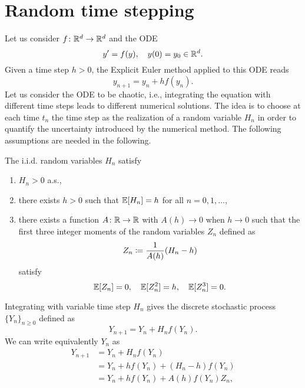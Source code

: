 \documentclass{scrartcl}
\begin{document}
	
\section{Random time stepping}

Let us consider $f\colon\mathbb{R}^d\to\mathbb{R}^d$ and the ODE 
\begin{equation}
	y' = f(y), \quad y(0) = y_0 \in \mathbb{R}^d.
\end{equation}
Given a time step $h > 0$, the Explicit Euler method applied to this ODE reads
\begin{equation}
	y_{n+1} = y_n + h f(y_n).
\end{equation}
Let us consider the ODE to be chaotic, i.e., integrating the equation with different time steps leads to different numerical solutions. The idea is to choose at each time $t_n$ the time step as the realization of a random variable $H_n$ in order to quantify the uncertainty introduced by the numerical method. The following assumptions are needed in the following.
\begin{assumption}\label{as:assumptionH} The i.i.d. random variables $H_n$ satisfy 
	\begin{enumerate}
		\item $H_n > 0$ a.s.,
		\item there exists $h > 0$ such that $\mathbb{E}[H_n] = h$ for all $n = 0, 1, \ldots$,
		\item there exists a function $A\colon\mathbb{R}\to\mathbb{R}$ with $A(h) \to 0$ when $h \to 0$ such that the first three integer moments of the random variables $Z_n$ defined as
		\begin{equation}
			Z_n \coloneqq \frac{1}{A(h)}(H_n - h)
		\end{equation}
		satisfy
		\begin{equation}
			\mathbb{E}[Z_n] = 0, \quad \mathbb{E}[Z_n^2] = h, \quad \mathbb{E}[Z_n^3] = 0.
		\end{equation}
	\end{enumerate}
\end{assumption}
\noindent Integrating with variable time step $H_n$ gives the discrete stochastic process $\{Y_n\}_{n\geq 0}$ defined as
\begin{equation}\label{eq:numHSto}
	Y_{n+1} = Y_n + H_n f(Y_n).
\end{equation}
We can write equivalently $Y_n$ as 
\begin{equation}
\begin{aligned}
	Y_{n+1} &= Y_n + H_n f(Y_n) \\
	&= Y_n + hf(Y_n) + (H_n - h)f(Y_n) \\
	&= Y_n + hf(Y_n) + A(h)f(Y_n)Z_n,
\end{aligned}
\end{equation}
\end{document}
